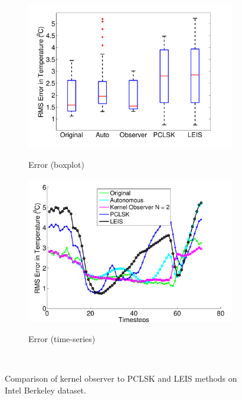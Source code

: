 \documentclass[letterpaper,12pt,peerreviewca,draftcls]{IEEEtran}
\begin{document}
\begin{figure}
\centering
\begin{minipage}{0.8\textwidth}
	\centering
	\begin{subfigure}[t]{0.48\textwidth}
		\includegraphics[width=\linewidth]{"Figure 10a"} \label{fig:intel_boxplots}
		\caption{Error (boxplot)}
	\end{subfigure}
	\begin{subfigure}[t]{0.48\textwidth}
		\includegraphics[width=\linewidth]{"Figure 10b"} \label{fig:intel_comp}
		\caption{Error (time-series)}
	\end{subfigure}
	\caption{Comparison of kernel observer to PCLSK and LEIS methods on Intel Berkeley dataset.}     \label{intel}
\end{minipage}\\


\end{figure}
\end{document}
